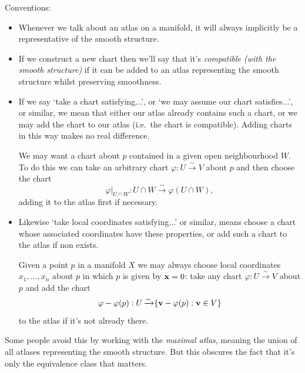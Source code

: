 \documentclass[a4paper,11pt]{article}
\begin{document}
	Conventions:
	\begin{itemize}
		\item Whenever we talk about an atlas on a manifold, it will always implicitly be a representative of the smooth structure.
		\item If we construct a new chart then we'll say that it's \emph{compatible (with the smooth structure)} if it can be added to an atlas representing the smooth structure whilst preserving smoothness.
		\item If we say `take a chart satisfying...', or `we may assume our chart satisfies...', or similar, we mean that either our atlas already contains such a chart, or we may add the chart to our atlas (i.e.\ the chart is compatible). Adding charts in this way makes no real difference.
		\begin{ex}
			We may want a chart about $p$ contained in a given open neighbourhood $W$. To do this we can take an arbitrary chart $\varphi: U \xrightarrow{\sim} V$ about $p$ and then choose the chart
			\[
				\varphi|_{U\cap W} : U \cap W \xrightarrow{\sim} \varphi(U \cap W),
			\]
			adding it to the atlas first if necessary. 
		\end{ex}
		\item Likewise `take local coordinates satisfying...' or similar, means choose a chart whose associated coordinates have these properties, or add such a chart to the atlas if non exists.
		\begin{ex}
			Given a point $p$ in a manifold $X$ we may always choose local coordinates $x_1, \dots, x_n$ about $p$ in which $p$ is given by $\vb{x} = 0$: take any chart $\varphi: U \xrightarrow{\sim} V$ about $p$ and add the chart
			\[
				\varphi - \varphi(p): U \operatorname{\xrightarrow{\sim}} \{\vb{v} - \varphi(p): \vb{v}\in V\}
			\]
			 to the atlas if it's not already there.
		\end{ex}
	\end{itemize}

	Some people avoid this by working with the \emph{maximal atlas}, meaning the union of all atlases representing the smooth structure. But this obscures the fact that it's only the equivalence class that matters.
\end{document}
